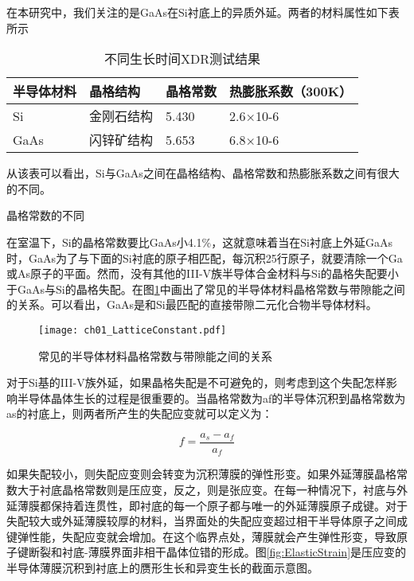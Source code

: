 在本研究中，我们关注的是GaAs在Si衬底上的异质外延。两者的材料属性如下表所示

\begin{table*}[htbp] 
	\centering
	\caption{\label{tab:TimeXDR}不同生长时间XDR测试结果}  
	\begin{tabular}{m{}<{\centering}m{}<{\centering}m{}<{\centering}m{}<{\centering}}  
		\toprule
			半导体材料 & 晶格结构 & 晶格常数 & 热膨胀系数（300K） \\
		\midrule 
			Si & 金刚石结构 & 5.430 & 2.6×10-6 \\
			GaAs & 闪锌矿结构 & 5.653 & 6.8×10-6 \\
		\bottomrule
	\end{tabular}
\end{table*}

从该表可以看出，Si与GaAs之间在晶格结构、晶格常数和热膨胀系数之间有很大的不同。

{\hei 晶格常数的不同}

在室温下，Si的晶格常数要比GaAs小4.1\%，这就意味着当在Si衬底上外延GaAs时，GaAs为了与下面的Si衬底的原子相匹配，每沉积25行原子，就要清除一个Ga或As原子的平面。然而，没有其他的III-V族半导体合金材料与Si的晶格失配要小于GaAs与Si的晶格失配。在图\ref{fig:LatticeConstant}中画出了常见的半导体材料晶格常数与带隙能之间的关系。可以看出，GaAs是和Si最匹配的直接带隙二元化合物半导体材料。

\begin{figure}[ht]
	\centering
	\texttt{[image: ch01\_LatticeConstant.pdf]}
	\caption{常见的半导体材料晶格常数与带隙能之间的关系}
	\label{fig:LatticeConstant}
\end{figure}

对于Si基的III-V族外延，如果晶格失配是不可避免的，则考虑到这个失配怎样影响半导体晶体生长的过程是很重要的。当晶格常数为af的半导体沉积到晶格常数为as的衬底上，则两者所产生的失配应变就可以定义为：

\begin{equation}
	\label{eq:f}
	f = \frac{a_s-a_f}{a_f}
\end{equation}

如果失配较小，则失配应变则会转变为沉积薄膜的弹性形变。如果外延薄膜晶格常数大于衬底晶格常数则是压应变，反之，则是张应变。在每一种情况下，衬底与外延薄膜都保持着连贯性，即衬底的每一个原子都与唯一的外延薄膜原子成键。对于失配较大或外延薄膜较厚的材料，当界面处的失配应变超过相干半导体原子之间成键弹性能，失配应变就会增加。在这个临界点处，薄膜就会产生弹性形变，导致原子键断裂和衬底-薄膜界面非相干晶体位错的形成。图\ref{fig:ElasticStrain}是压应变的半导体薄膜沉积到衬底上的赝形生长和异变生长的截面示意图。

